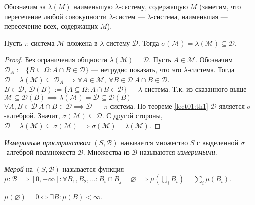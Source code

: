         Обозначим за $\lambda(M)$ наименьшую $\lambda$-систему, содержащую $M$ (заметим, что пересечение любой совокупности $\lambda$-систем --- $\lambda$-система, наименьшая --- пересечение всех, содержащих $M$).
        \begin{theorem}\label{lect01:th2}
            Пусть $\pi$-система $\mathcal{M}$ вложена в $\lambda$-систему $\mathcal{D}$. Тогда $\sigma(\mathcal{M}) = \lambda(\mathcal{M}) \subseteq \mathcal{D}$.
        \end{theorem}
        \begin{proof}
            Без ограничения общности $\lambda(\mathcal{M}) = \mathcal{D}$. Пусть $A \in \mathcal{M}$. Обозначим $\mathcal{D}_A := \{ B \subseteq \Omega : A \cap B \in \mathcal{D} \}$ --- нетрудно показать, что это $\lambda$-система. Тогда $\mathcal{D} = \lambda(\mathcal{M}) \subseteq \mathcal{D}_A \implies \forall A \in \mathcal{M}, \ \forall B \in \mathcal{D} \ A \cap B \in \mathcal{D}$. \\
            $B \in \mathcal{D}, \ \mathcal{D}(B) := \{ A \subseteq \Omega : A \cap B \in \mathcal{D} \}$ --- $\lambda$-система. Т.к. из сказанного выше $\mathcal{M} \subseteq \mathcal{D}(B) \implies \lambda(\mathcal{M}) = \mathcal{D} \subseteq \mathcal{D}(B)$\\
            $\forall A, B \in \mathcal{D} \ A \cap B \in \mathcal{D} \implies \mathcal{D}$ --- $\pi$-система. По теореме \ref{lect01:th1} $\mathcal{D}$ является $\sigma$-алгеброй. Значит, $\sigma(\mathcal{M}) \subseteq \mathcal{D}$. С другой стороны, $\mathcal{D} = \lambda(\mathcal{M}) \subseteq \sigma(\mathcal{M}) \implies \sigma(\mathcal{M}) = \lambda(\mathcal{M})$.
        \end{proof}
        \begin{definition}\label{lect01:def7}
            \emph{Измеримым пространством} $(S, \mathcal{B})$ называется множество $S$ с выделенной $\sigma$-алгеброй подмножеств $\mathcal{B}$. Множества из $\mathcal{B}$ называются \emph{измеримыми}.
        \end{definition}
        \begin{definition}\label{lect01:def8}
            \emph{Мерой} на $(S, \mathcal{B})$ называется функция $\mu : \mathcal{B} \implies \left[0, +\infty\right] : \forall {B_1, B_2, ...} : B_i \cap B_j = \varnothing \implies \mu(\bigcup\limits_i B_i) = \sum\limits_i \mu(B_i)$.
        \end{definition}
        \begin{prop}\label{lect01:prop4}
            $\mu(\varnothing) = 0 \iff \exists B : \mu(B) < \infty$.
        \end{prop}
